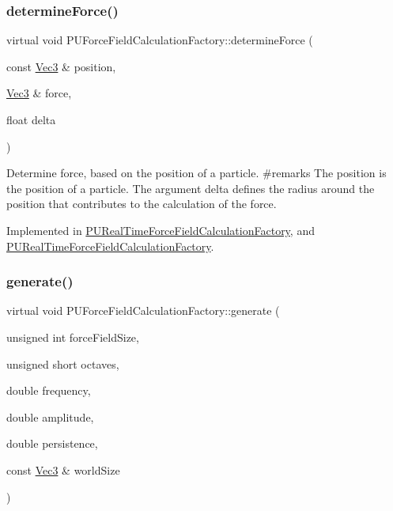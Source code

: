 \subsubsection{\texorpdfstring{determine\+Force()}{determineForce()}\hspace{0.1cm}{\footnotesize\ttfamily [2/2]}}
{\footnotesize\ttfamily virtual void P\+U\+Force\+Field\+Calculation\+Factory\+::determine\+Force (\begin{DoxyParamCaption}\item[{const \hyperlink{classVec3}{Vec3} \&}]{position,  }\item[{\hyperlink{classVec3}{Vec3} \&}]{force,  }\item[{float}]{delta }\end{DoxyParamCaption})\hspace{0.3cm}{\ttfamily [pure virtual]}}

Determine force, based on the position of a particle. \#remarks The position is the position of a particle. The argument \textquotesingle{}delta\textquotesingle{} defines the radius around the position that contributes to the calculation of the force. 

Implemented in \hyperlink{classPURealTimeForceFieldCalculationFactory_a77c8efbd2a6dcd7e5a25ee6bd48d8f6e}{P\+U\+Real\+Time\+Force\+Field\+Calculation\+Factory}, and \hyperlink{classPURealTimeForceFieldCalculationFactory_a8469774f9e5bdb65321f0955fb016670}{P\+U\+Real\+Time\+Force\+Field\+Calculation\+Factory}.

\mbox{\label{classPUForceFieldCalculationFactory_a8292a8ec09320a66c6ef130e98a7fd90}} 
\subsubsection{\texorpdfstring{generate()}{generate()}\hspace{0.1cm}{\footnotesize\ttfamily [1/2]}}
{\footnotesize\ttfamily virtual void P\+U\+Force\+Field\+Calculation\+Factory\+::generate (\begin{DoxyParamCaption}\item[{unsigned int}]{force\+Field\+Size,  }\item[{unsigned short}]{octaves,  }\item[{double}]{frequency,  }\item[{double}]{amplitude,  }\item[{double}]{persistence,  }\item[{const \hyperlink{classVec3}{Vec3} \&}]{world\+Size }\end{DoxyParamCaption})\hspace{0.3cm}{\ttfamily [pure virtual]}}

